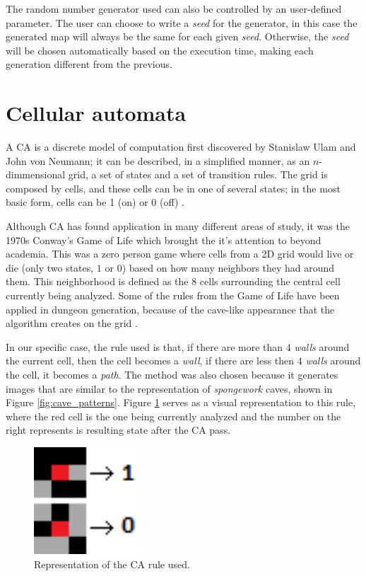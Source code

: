 The random number generator used can also be controlled by an user-defined parameter. The user can choose to write a \emph{seed} for the generator, in this case the generated map will always be the same for each given \emph{seed}. Otherwise, the \emph{seed} will be chosen automatically based on the execution time, making each generation different from the previous.

\section{Cellular automata}

A CA is a discrete model of computation first discovered by Stanislaw Ulam and John von Neumann; it can be described, in a simplified manner, as an \(n\)-dimmensional grid, a set of states and a set of transition rules. The grid is composed by cells, and these cells can be in one of several states; in the most basic form, cells can be 1 (on) or 0 (off) \cite{wolfram:1983}.

Although CA has found application in many different areas of study, it was the 1970s Conway's Game of Life which brought the it's attention to beyond academia. This was a zero person game where cells from a 2D grid would live or die (only two states, \(1\) or \(0\)) based on how many neighbors they had around them. This neighborhood is defined as the 8 cells surrounding the central cell currently being analyzed. Some of the rules from the Game of Life have been applied in dungeon generation, because of the cave-like appearance that the algorithm creates on the grid \cite{shaker:2016}.

In our specific case, the rule used is that, if there are more than \(4\) \emph{walls} around the current cell, then the cell becomes a \emph{wall}, if there are less then \(4\) \emph{walls} around the cell, it becomes a \emph{path}. The method was also chosen because it generates images that are similar to the representation of \emph{spongework} caves, shown in Figure \ref{fig:cave_patterns}. Figure \ref{fig:ca_rule} serves as a visual representation to this rule, where the red cell is the one being currently analyzed and the number on the right represents is resulting state after the CA pass.

\begin{figure}[h]
    \caption{Representation of the CA rule used.}
    \centerline{\includegraphics[width=4cm]{images/development/ca_rule.png}}
    \label{fig:ca_rule}
\end{figure}

